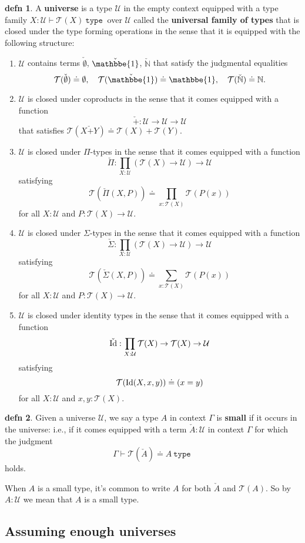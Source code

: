 \documentclass{amsart}
\theoremstyle{theorem}
\theoremstyle{definition}
\newtheorem*{defn}{defn}
\theoremstyle{remark}
\newcommand{\0}{\mathbbe{0}}
\newcommand{\1}{\mathbbe{1}}
\newcommand{\2}{\mathbbe{2}}
\newcommand{\3}{\mathbbe{3}}
\newcommand{\4}{\mathbbe{4}}
\newcommand{\univ}{{~\texttt{type}~}}
\newcommand{\bN}{{\mathbb{N}}}
\newcommand{\UU}{\mathcal{U}}
\newcommand{\sT}{\mathcal{T}}
\newcommand{\Id}{\textup{\text{Id}}}
\begin{document}
\begin{defn} A \textbf{universe} is a type $\UU$ in the empty context equipped with a type family $X : \UU \vdash \sT(X) \univ$ over $\UU$ called the \textbf{universal family of types} that is closed under the type forming operations in the sense that it is equipped with the following structure:
\begin{enumerate}
\item $\UU$ contains terms $\check{\emptyset}$, $\check{\1}$, $\check{\bN}$ that satisfy the judgmental equalities
\[ \sT(\check{\emptyset}) \doteq \emptyset, \quad \sT(\check{\1}) \doteq \1, \quad \sT(\check{\bN}) \doteq \bN.\]
\item $\UU$ is closed under coproducts in the sense that it comes equipped with a function
\[ \check{+} \colon \UU \to \UU \to \UU\] that satisfies $\sT(X\check{+}Y) \doteq \sT(X) + \sT(Y)$.
\item $\UU$ is closed under $\Pi$-types in the sense that it comes equipped with a function
\[ \check{\Pi} \colon \prod_{X: \UU} (\sT(X) \to \UU) \to \UU\] satisfying
\[ \sT(\check{\Pi}(X,P)) \doteq \prod_{x : \sT(X)} \sT(P(x))\]
for all $X : \UU$ and $P \colon \sT(X) \to \UU$.
\item $\UU$ is closed under $\Sigma$-types in the sense that it comes equipped with a function
\[ \check{\Sigma} \colon \prod_{X: \UU} (\sT(X) \to \UU) \to \UU\] satisfying
\[ \sT(\check{\Sigma}(X,P)) \doteq \sum_{x : \sT(X)} \sT(P(x))\]
for all $X : \UU$ and $P \colon \sT(X) \to \UU$.
\item $\UU$ is closed under identity types in the sense that it comes equipped with a function
\[ \check{\Id} : \prod_{X : \UU} \sT(X) \to \sT(X) \to \UU\]
satisfying
\[ \sT(\Id(X,x,y)) \doteq (x = y)\]
for all $X: \UU$ and $x,y : \sT(X)$.
\end{enumerate}
\end{defn} 

\begin{defn} Given a universe $\UU$, we say a type $A$ in context $\Gamma$ is \textbf{small} if it occurs in the universe: i.e., if it comes equipped with a term $\check{A} : \UU$ in context $\Gamma$ for which the judgment
\[ \Gamma \vdash \sT(\check{A}) \doteq A \univ\]
holds. 
\end{defn}

When $A$ is a small type, it's common to write $A$ for both $\check{A}$ and $\sT(A)$. So by $A : \UU$ we mean that $A$ is a small type.

\subsection*{Assuming enough universes}
\end{document}
